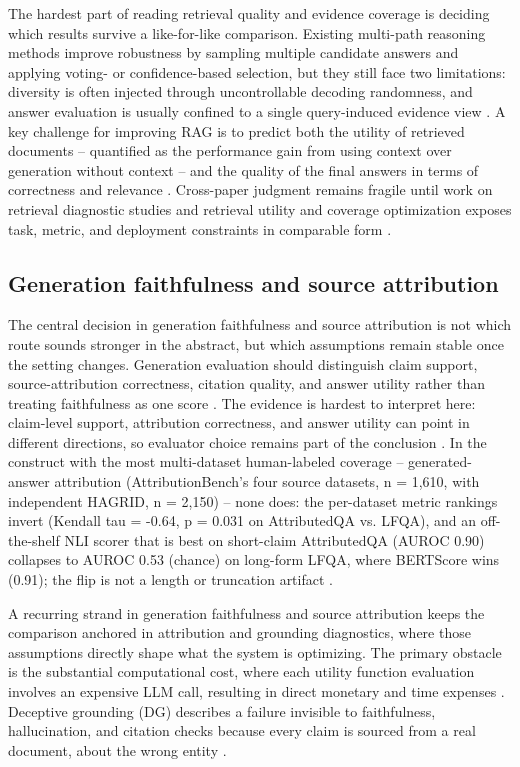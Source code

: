 \documentclass[a4paper,11pt]{article}
\begin{document}
The hardest part of reading retrieval quality and evidence coverage is deciding which results survive a like-for-like comparison. Existing multi-path reasoning methods improve robustness by sampling multiple candidate answers and applying voting- or confidence-based selection, but they still face two limitations: diversity is often injected through uncontrollable decoding randomness, and answer evaluation is usually confined to a single query-induced evidence view \citep{Sun2026Robust}. A key challenge for improving RAG is to predict both the utility of retrieved documents -- quantified as the performance gain from using context over generation without context -- and the quality of the final answers in terms of correctness and relevance \citep{Tian2026Predicting}. Cross-paper judgment remains fragile until work on retrieval diagnostic studies and retrieval utility and coverage optimization exposes task, metric, and deployment constraints in comparable form \citep{Taiwo2026Evaluating,Salemi2024Evaluating}.
\subsection{Generation faithfulness and source attribution}


The central decision in generation faithfulness and source attribution is not which route sounds stronger in the abstract, but which assumptions remain stable once the setting changes. Generation evaluation should distinguish claim support, source-attribution correctness, citation quality, and answer utility rather than treating faithfulness as one score \citep{Ding2026Attribution,Nematov2025Source,SaadFalcon2023Ares,Murugaraj2025Ragvue}. The evidence is hardest to interpret here: claim-level support, attribution correctness, and answer utility can point in different directions, so evaluator choice remains part of the conclusion \citep{Ding2026Attribution,Nematov2025Source,SaadFalcon2023Ares,Murugaraj2025Ragvue}. In the construct with the most multi-dataset human-labeled coverage -- generated-answer attribution (AttributionBench's four source datasets, n = 1,610, with independent HAGRID, n = 2,150) -- none does: the per-dataset metric rankings invert (Kendall tau = -0.64, p = 0.031 on AttributedQA vs. LFQA), and an off-the-shelf NLI scorer that is best on short-claim AttributedQA (AUROC 0.90) collapses to AUROC 0.53 (chance) on long-form LFQA, where BERTScore wins (0.91); the flip is not a length or truncation artifact \citep{Ding2026Attribution}.

A recurring strand in generation faithfulness and source attribution keeps the comparison anchored in attribution and grounding diagnostics, where those assumptions directly shape what the system is optimizing. The primary obstacle is the substantial computational cost, where each utility function evaluation involves an expensive LLM call, resulting in direct monetary and time expenses \citep{Nematov2025Source}. Deceptive grounding (DG) describes a failure invisible to faithfulness, hallucination, and citation checks because every claim is sourced from a real document, about the wrong entity \citep{Caruzzo2026Deceptive}.
\end{document}
